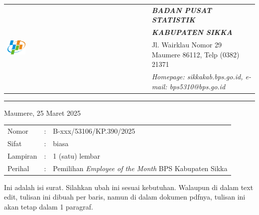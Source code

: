\documentclass{article}
\begin{document}


\begin{tabular}{ll}
   \multirow{4}{*}{\includegraphics[width=0.13\textwidth]{logo/bps-logo.png}} %
   &
   \large{\textbf{\textit{BADAN PUSAT STATISTIK}}} \\
   & \large{\textbf{\textit{KABUPATEN SIKKA}}} \\
   & Jl. Wairklau Nomor 29 Maumere 86112, Telp (0382) 21371 \\
   & \textit{Homepage: sikkakab.bps.go.id, e-mail: bps5310@bps.go.id} \\
\end{tabular}

\hfill

\vspace{-1em} %

\rule{\linewidth}{1pt} %


\hfill
Maumere, 25 Maret 2025

\begin{tabular}{@{} lcl}
	Nomor&:&B-xxx/53106/KP.390/2025 \\
	Sifat&:&biasa \\
	Lampiran&:&1 (satu) lembar\\
    Perihal&:& Pemilihan \textit{Employee of the Month} BPS Kabupaten Sikka\\
\end{tabular}

\bigskip %


Ini adalah isi surat.
Silahkan ubah ini sesuai kebutuhan.
Walaupun di dalam text edit, tulisan ini dibuah per baris,
namun di dalam dokumen pdfnya, tulisan ini akan tetap dalam 1 paragraf.
\end{document}
